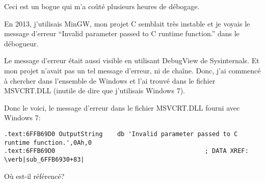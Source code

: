 
Ceci est un bogue qui m'a coûté plusieurs heures de débogage.

En 2013, j'utilisais MinGW, mon projet C semblait très instable et je voyais le
message d'erreur ``Invalid parameter passed to C runtime function.'' dans le débogueur.

Le message d'erreur était aussi visible en utilisant DebugView de Sysinternals.
Et mon projet n'avait pas un tel message d'erreur, ni de chaîne.
Donc, j'ai commencé à chercher dans l'ensemble de Windows et l'ai trouvé dans le
fichier MSVCRT.DLL (inutile de dire que j'utilisais Windows 7).

Donc le voici, le message d'erreur dans le fichier MSVCRT.DLL fourni avec Windows 7:

\begin{lstlisting}[style=customasmx86]
.text:6FFB69D0 OutputString    db 'Invalid parameter passed to C runtime function.',0Ah,0
.text:6FFB69D0                                         ; DATA XREF: \verb|sub_6FFB6930+83|
\end{lstlisting}

Où est-il référencé?

